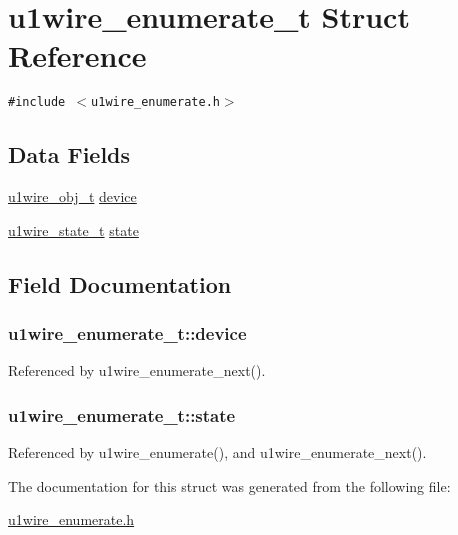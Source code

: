 \hypertarget{structu1wire__enumerate__t}{
\section{u1wire\_\-enumerate\_\-t Struct Reference}
\label{structu1wire__enumerate__t}
}
{\tt \#include $<$u1wire\_\-enumerate.h$>$}

\subsection*{Data Fields}
\begin{CompactItemize}
\item 
\hyperlink{structu1wire__obj__t}{u1wire\_\-obj\_\-t} \hyperlink{structu1wire__enumerate__t_96da0ac77119874c0ed9be7a5d980e7d}{device}
\item 
\hyperlink{structu1wire__state__t}{u1wire\_\-state\_\-t} \hyperlink{structu1wire__enumerate__t_7f8ff03f282986ff3e6e405e5be4fce7}{state}
\end{CompactItemize}


\subsection{Field Documentation}
\hypertarget{structu1wire__enumerate__t_96da0ac77119874c0ed9be7a5d980e7d}{
\subsubsection{ {\bf u1wire\_\-enumerate\_\-t::device}}}
\label{structu1wire__enumerate__t_96da0ac77119874c0ed9be7a5d980e7d}




Referenced by u1wire\_\-enumerate\_\-next().\hypertarget{structu1wire__enumerate__t_7f8ff03f282986ff3e6e405e5be4fce7}{
\subsubsection{ {\bf u1wire\_\-enumerate\_\-t::state}}}
\label{structu1wire__enumerate__t_7f8ff03f282986ff3e6e405e5be4fce7}




Referenced by u1wire\_\-enumerate(), and u1wire\_\-enumerate\_\-next().

The documentation for this struct was generated from the following file:\begin{CompactItemize}
\item 
\hyperlink{u1wire__enumerate_8h}{u1wire\_\-enumerate.h}\end{CompactItemize}
